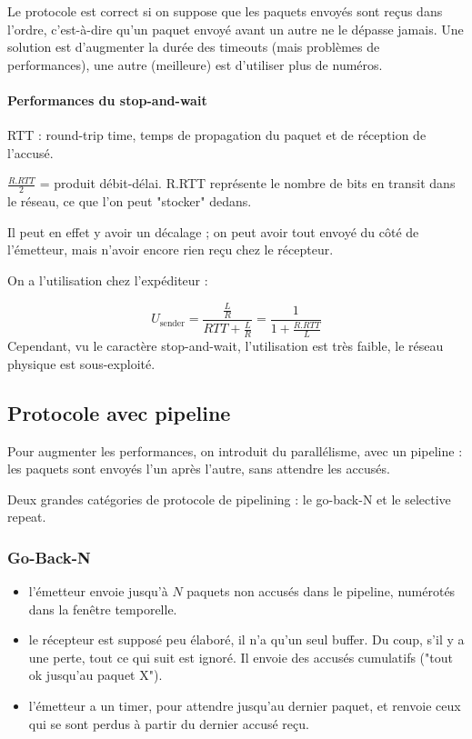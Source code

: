 	Le protocole est correct si on suppose que les paquets envoyés sont reçus dans l'ordre, c'est-à-dire qu'un paquet envoyé avant un autre ne le dépasse jamais. Une solution est d'augmenter la durée des timeouts (mais problèmes de performances), une autre (meilleure) est d'utiliser plus de numéros.
	
	
	
	\paragraph{Performances du stop-and-wait}
	
	RTT : round-trip time, temps de propagation du paquet et de réception de l'accusé.
	
	
	$\frac{R.RTT}{2}$ = produit débit-délai. R.RTT représente le nombre de bits en transit dans le réseau, ce que l'on peut "stocker" dedans. 
	
	Il peut en effet y avoir un décalage ; on peut avoir tout envoyé du côté de l'émetteur, mais n'avoir encore rien reçu chez le récepteur.
	
	On a l'utilisation chez l'expéditeur :
	
	$$U_{\text{sender}} = \frac{\frac{L}{R}}{RTT + \frac{L}{R}} = \frac{1}{1 + \frac{R . RTT}{L}}$$ 		 	
Cependant, vu le caractère stop-and-wait, l'utilisation est très faible, le réseau physique est sous-exploité. 		 		 		 		\subsection{Protocole avec pipeline} 		 		Pour augmenter les performances, on introduit du parallélisme, avec un pipeline : les paquets sont envoyés l'un après l'autre, sans attendre les accusés.

			Deux grandes catégories de protocole de pipelining : le go-back-N et le selective repeat. 
											
	\subsubsection{Go-Back-N} 
	\begin{itemize} 			
	\item l'émetteur envoie jusqu'à $N$ paquets non accusés dans le pipeline, numérotés dans la fenêtre temporelle. 					
	\item le récepteur est supposé peu élaboré, il n'a qu'un seul buffer. Du coup, s'il y a une perte, tout ce qui suit est ignoré. Il envoie des accusés cumulatifs ("tout ok jusqu'au paquet X").
	\item l'émetteur a un timer, pour attendre jusqu'au dernier paquet, et renvoie ceux qui se sont perdus à partir du dernier accusé reçu.
	\end{itemize}
		
